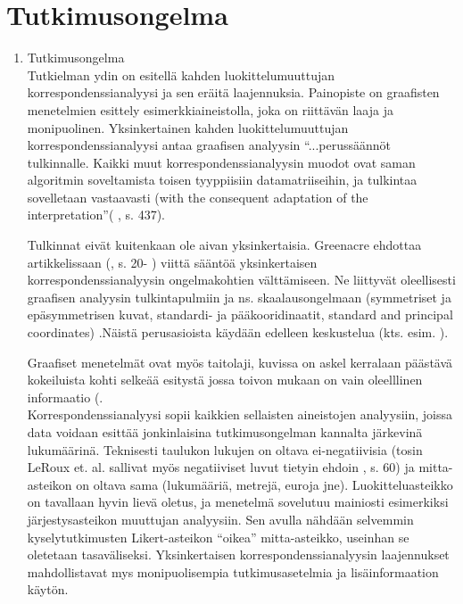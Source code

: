 \section{Tutkimusongelma}
\label{disptutong1}

\begin{enumerate} %
\item Tutkimusongelma\\

Tutkielman ydin on esitellä kahden luokittelumuuttujan korrespondenssianalyysi ja sen eräitä laajennuksia. Painopiste on graafisten menetelmien esittely esimerkkiaineistolla, joka on riittävän laaja ja monipuolinen. Yksinkertainen kahden luokittelumuuttujan korrespondenssianalyysi antaa graafisen analyysin ``...perussäännöt tulkinnalle. Kaikki muut korrespondenssianalyysin muodot ovat saman algoritmin soveltamista toisen tyyppiisiin datamatriiseihin, ja tulkintaa sovelletaan vastaavasti (with the consequent adaptation of the interpretation''( \cite{RefWorks:57}, s. 437).

Tulkinnat eivät kuitenkaan ole aivan yksinkertaisia. Greenacre ehdottaa artikkelissaan (\cite{RefWorks:73}, s. 20- ) viittä sääntöä yksinkertaisen korrespondenssianalyysin ongelmakohtien välttämiseen. Ne liittyvät oleellisesti graafisen analyysin tulkintapulmiin ja ns. skaalausongelmaan (symmetriset ja epäsymmetrisen kuvat, standardi- ja pääkooridinaatit, standard and principal coordinates) .Näistä perusasioista käydään edelleen keskustelua (kts. esim. \cite{RefWorks:77}).

Graafiset menetelmät ovat myös taitolaji, kuvissa on askel kerralaan päästävä kokeiluista kohti selkeää esitystä jossa toivon mukaan on vain oleelllinen informaatio (\cite{RefWorks:60}.\\

Korrespondenssianalyysi sopii kaikkien sellaisten aineistojen analyysiin, joissa data voidaan esittää jonkinlaisina tutkimusongelman kannalta järkevinä lukumäärinä. Teknisesti taulukon lukujen on oltava ei-negatiivisia (tosin LeRoux et. al. sallivat myös negatiiviset luvut tietyin ehdoin \cite{RefWorks:68} , s. 60) ja mitta-asteikon on oltava sama (lukumääriä, metrejä, euroja jne). Luokitteluasteikko on tavallaan hyvin lievä oletus, ja menetelmä sovelutuu mainiosti esimerkiksi järjestysasteikon muuttujan analyysiin. Sen avulla nähdään selvemmin kyselytutkimusten Likert-asteikon ``oikea'' mitta-asteikko, useinhan se oletetaan tasaväliseksi. Yksinkertaisen korrespondenssianalyysin laajennukset mahdollistavat mys monipuolisempia tutkimusasetelmia ja lisäinformaation käytön.


\end{enumerate}
